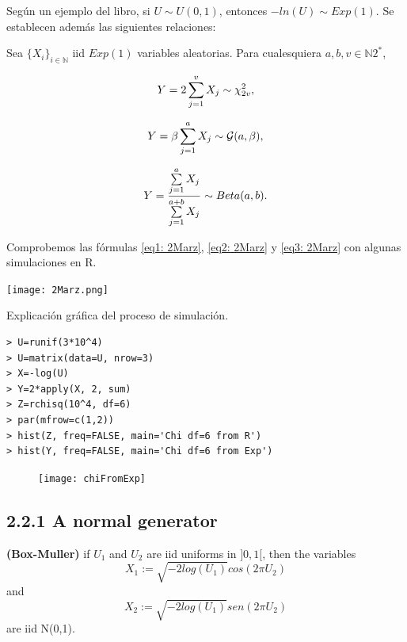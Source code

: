 Según un ejemplo del libro, si $U \sim U(0,1)$, entonces
$-ln(U) \sim Exp(1)$. Se establecen además las siguientes
relaciones:

\begin{teo}
Sea $\{ X_{i} \}_{i \in \mathbb{N}}$ iid $Exp(1)$ variables aleatorias.
Para cualesquiera $a, b, v \in \mathbb{N}2^{*}$, 

\begin{equation}
\label{eq1: 2Marz}
Y=2 \sum\limits_{j=1}^{v}X_{j} \sim \chi_{2v}^{2},
\end{equation}

\begin{equation}
\label{eq2: 2Marz}
Y=\beta \sum\limits_{j=1}^{a}X_{j} \sim \mathcal{G}(a, \beta),
\end{equation}

\begin{equation}
\label{eq3: 2Marz}
Y= \frac{\sum\limits_{j=1}^{a}X_{j}}{\sum\limits_{j=1}^{a+b}X_{j}} 
\sim Beta(a,b).
\end{equation}
\end{teo}

Comprobemos las fórmulas \eqref{eq1: 2Marz}, \eqref{eq2: 2Marz}
y \eqref{eq3: 2Marz} con algunas simulaciones en R.

\begin{center}
\begin{marginfigure}
  \centering
  \texttt{[image: 2Marz.png]}
  \caption{Explicación gráfica del proceso de simulación.}
\end{marginfigure}
\end{center}

\begin{verbatim}
> U=runif(3*10^4)
> U=matrix(data=U, nrow=3)
> X=-log(U)
> Y=2*apply(X, 2, sum)
> Z=rchisq(10^4, df=6)
> par(mfrow=c(1,2))
> hist(Z, freq=FALSE, main='Chi df=6 from R')
> hist(Y, freq=FALSE, main='Chi df=6 from Exp')
\end{verbatim}

\begin{figure}[H]
\centering
	\texttt{[image: chiFromExp]} 
\end{figure}

\subsection{2.2.1 A normal generator}
\begin{teo}
\textbf{(Box-Muller)} if $U_{1}$ and $U_{2}$ are iid uniforms in $]0,1[$,
then the variables
\[
X_{1} := \sqrt{-2 log(U_{1})} cos(2 \pi U_{2})
\]
and 
\[
X_{2} := \sqrt{-2 log(U_{1})} sen(2 \pi U_{2})
\]
are iid N(0,1).
\end{teo}

